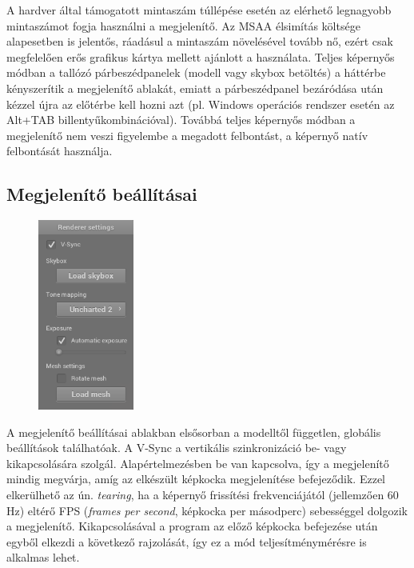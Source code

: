 A hardver által támogatott mintaszám túllépése esetén az elérhető legnagyobb mintaszámot fogja használni a megjelenítő. Az MSAA élsimítás költsége alapesetben is jelentős, ráadásul a mintaszám növelésével tovább nő, ezért csak megfelelően erős grafikus kártya mellett ajánlott a használata. Teljes képernyős módban a tallózó párbeszédpanelek (modell vagy skybox betöltés) a háttérbe kényszerítik a megjelenítő ablakát, emiatt a párbeszédpanel bezáródása után kézzel újra az előtérbe kell hozni azt (pl. Windows operációs rendszer esetén az Alt+TAB billentyűkombinációval). Továbbá teljes képernyős módban a megjelenítő nem veszi figyelembe a megadott felbontást, a képernyő natív felbontását használja.

\clearpage

\subsection{Megjelenítő beállításai}

\begin{figure}
    \vspace{-23pt}
    \includegraphics[width=0.28\textwidth]{images/renderer_settings.png}
    \vspace{-20pt}
\end{figure}

A megjelenítő beállításai ablakban elsősorban a modelltől független, globális beállítások találhatóak. A V-Sync a vertikális szinkronizáció be- vagy kikapcsolására szolgál. Alapértelmezésben be van kapcsolva, így a megjelenítő mindig megvárja, amíg az elkészült képkocka megjelenítése befejeződik. Ezzel elkerülhető az ún. \textit{tearing}, ha a képernyő frissítési frekvenciájától (jellemzően 60 Hz) eltérő FPS (\textit{frames per second}, képkocka per másodperc) sebességgel dolgozik a megjelenítő. Kikapcsolásával a program az előző képkocka befejezése után egyből elkezdi a következő rajzolását, így ez a mód teljesítménymérésre is alkalmas lehet.

